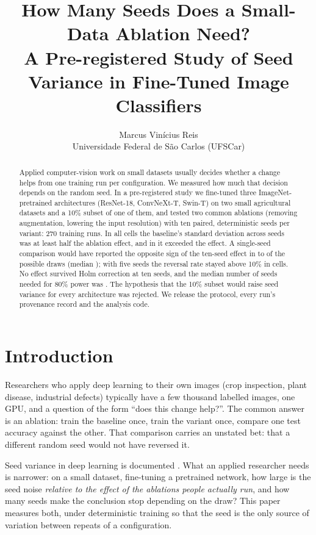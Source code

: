 \documentclass[10pt]{article}
\title{How Many Seeds Does a Small-Data Ablation Need?\\
A Pre-registered Study of Seed Variance in Fine-Tuned Image Classifiers}
\author{Marcus Vin\'icius Reis\\Universidade Federal de S\~ao Carlos (UFSCar)}
\date{\todo{date}}
\begin{document}
\maketitle

\begin{abstract}
Applied computer-vision work on small datasets usually decides whether a change
helps from one training run per configuration. We measured how much that
decision depends on the random seed. In a pre-registered study we fine-tuned
three ImageNet-pretrained architectures (ResNet-18, ConvNeXt-T, Swin-T) on two
small agricultural datasets and a 10\% subset of one of them, and tested two
common ablations (removing augmentation, lowering the input resolution) with
ten paired, deterministic seeds per variant: 270 training runs. In all \NCells{}
cells the baseline's standard deviation across seeds was at least half the
ablation effect, and in \NNoiseOne{} it exceeded the effect. A single-seed
comparison would have reported the opposite sign of the ten-seed effect in
\KOneMin{} to \KOneMax{} of the possible draws (median \KOneMedian{}); with five
seeds the reversal rate stayed above 10\% in \NKFiveAbove{} cells. No effect
survived Holm correction at ten seeds, and the median number of seeds needed for
80\% power was \PowerMedian{}. The hypothesis that the 10\% subset would raise
seed variance for every architecture was rejected. We release the protocol,
every run's provenance record and the analysis code.
\end{abstract}

\section{Introduction}

Researchers who apply deep learning to their own images (crop inspection, plant
disease, industrial defects) typically have a few thousand labelled images, one
GPU, and a question of the form ``does this change help?''. The common answer
is an ablation: train the baseline once, train the variant once, compare one
test accuracy against the other. That comparison carries an unstated bet: that
a different random seed would not have reversed it.

Seed variance in deep learning is documented
\citep{picard2021seed,bouthillier2021accounting,summers2021nondeterminism}.
What an applied researcher needs is narrower: on a small dataset, fine-tuning a
pretrained network, how large is the seed noise \emph{relative to the effect of
the ablations people actually run}, and how many seeds make the conclusion stop
depending on the draw? This paper measures both, under deterministic training
so that the seed is the only source of variation between repeats of a
configuration.
\end{document}
